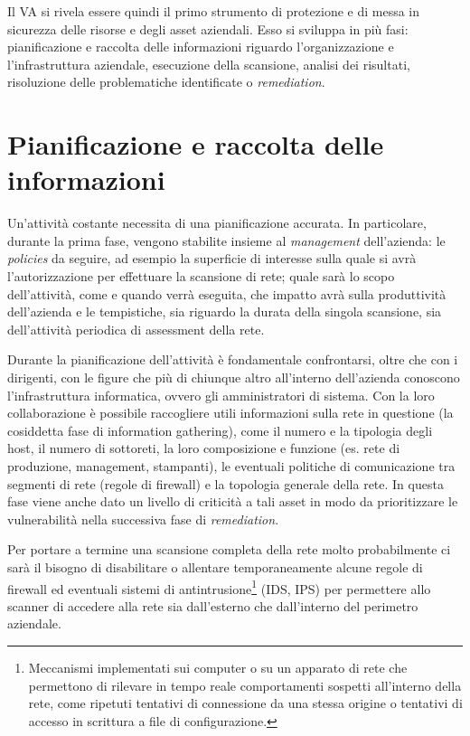 \documentclass[target=mst,aauheader=]{thud}
\begin{document}
Il VA si rivela essere quindi il primo strumento di protezione e di messa in sicurezza delle risorse e degli asset aziendali. Esso si sviluppa in più fasi: pianificazione e raccolta delle informazioni riguardo l’organizzazione e l’infrastruttura aziendale, esecuzione della scansione, analisi dei risultati, risoluzione delle problematiche identificate o \textit{remediation}.


\section{Pianificazione e raccolta delle informazioni}
Un’attività costante necessita di una pianificazione accurata. In particolare, durante la prima fase, vengono stabilite insieme al \textit{management} dell’azienda: le \textit{policies} da seguire, ad esempio la superficie di interesse sulla quale si avrà l’autorizzazione per effettuare la scansione di rete; quale sarà lo scopo dell’attività, come e quando verrà eseguita, che impatto avrà sulla produttività dell’azienda e le tempistiche, sia riguardo la durata della singola scansione, sia dell’attività periodica di assessment della rete.

Durante la pianificazione dell’attività è fondamentale confrontarsi, oltre che con i dirigenti, con le figure che più di chiunque altro all’interno dell’azienda conoscono l’infrastruttura informatica, ovvero gli amministratori di sistema. Con la loro collaborazione è possibile raccogliere utili informazioni sulla rete in questione (la cosiddetta fase di information gathering), come il numero e la tipologia degli host, il numero di sottoreti, la loro composizione e funzione (es. rete di produzione, management, stampanti), le eventuali politiche di comunicazione tra segmenti di rete (regole di firewall) e la topologia generale della rete. In questa fase viene anche dato un livello di criticità a tali asset in modo da prioritizzare le vulnerabilità nella successiva fase di \textit{remediation}.

Per portare a termine una scansione completa della rete molto probabilmente ci sarà il bisogno di disabilitare o allentare temporaneamente alcune regole di firewall ed eventuali sistemi di antintrusione\footnote{Meccanismi implementati sui computer o su un apparato di rete che permettono di rilevare in tempo reale comportamenti sospetti all’interno della rete, come ripetuti tentativi di connessione da una stessa origine o tentativi di accesso in scrittura a file di configurazione.} (IDS, IPS) per permettere allo scanner di accedere alla rete sia dall’esterno che dall’interno del perimetro aziendale. 
\end{document}
